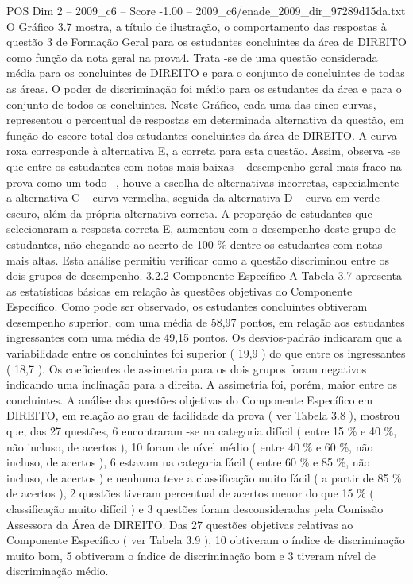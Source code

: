 \begin{textsample}{POS Dim 2 – 2009\_c6 – Score -1.00 – 2009\_c6/enade\_2009\_dir\_97289d15da.txt}
O Gráfico 3.7 mostra, a título de ilustração, o comportamento das respostas à questão 3 de Formação Geral para os estudantes concluintes da área de DIREITO como função da nota geral na prova4.
Trata -se de uma questão considerada média para os concluintes de DIREITO e para o conjunto de concluintes de todas as áreas.
O poder de discriminação foi médio para os estudantes da área e para o conjunto de todos os concluintes.
Neste Gráfico, cada uma das cinco curvas, representou o percentual de respostas em determinada alternativa da questão, em função do escore total dos estudantes concluintes da área de DIREITO.
A curva roxa corresponde à alternativa E, a correta para esta questão.
Assim, observa -se que entre os estudantes com notas mais baixas – desempenho geral mais fraco na prova como um todo –, houve a escolha de alternativas incorretas, especialmente a alternativa C – curva vermelha, seguida da alternativa D – curva em verde escuro, além da própria alternativa correta.
A proporção de estudantes que selecionaram a resposta correta E, aumentou com o desempenho deste grupo de estudantes, não chegando ao acerto de 100 \% dentre os estudantes com notas mais altas.
Esta análise permitiu verificar como a questão discriminou entre os dois grupos de desempenho. 3.2.2 Componente Específico A Tabela 3.7 apresenta as estatísticas básicas em relação às questões objetivas do Componente Específico.
Como pode ser observado, os estudantes concluintes obtiveram desempenho superior, com uma média de 58,97 pontos, em relação aos estudantes ingressantes com uma média de 49,15 pontos.
Os desvios-padrão indicaram que a variabilidade entre os concluintes foi superior ( 19,9 ) do que entre os ingressantes ( 18,7 ).
Os coeficientes de assimetria para os dois grupos foram negativos indicando uma inclinação para a direita.
A assimetria foi, porém, maior entre os concluintes.
A análise das questões objetivas do Componente Específico em DIREITO, em relação ao grau de facilidade da prova ( ver Tabela 3.8 ), mostrou que, das 27 questões, 6 encontraram -se na categoria difícil ( entre 15 \% e 40 \%, não incluso, de acertos ), 10 foram de nível médio ( entre 40 \% e 60 \%, não incluso, de acertos ), 6 estavam na categoria fácil ( entre 60 \% e 85 \%, não incluso, de acertos ) e nenhuma teve a classificação muito fácil ( a partir de 85 \% de acertos ), 2 questões tiveram percentual de acertos menor do que 15 \% ( classificação muito difícil ) e 3 questões foram desconsideradas pela Comissão Assessora da Área de DIREITO.
Das 27 questões objetivas relativas ao Componente Específico ( ver Tabela 3.9 ), 10 obtiveram o índice de discriminação muito bom, 5 obtiveram o índice de discriminação bom e 3 tiveram nível de discriminação médio.

\end{textsample}
